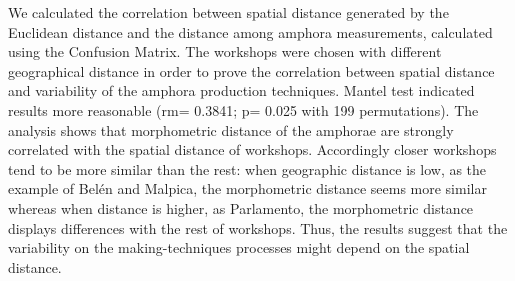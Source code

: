 \documentclass[review]{elsarticle}
\begin{document}
 We calculated the correlation between spatial distance generated by the Euclidean distance and the distance among amphora measurements, calculated using the Confusion Matrix. The workshops were chosen with different geographical distance in order to prove the correlation between spatial distance and variability of the amphora production techniques. Mantel test indicated results more reasonable (rm= 0.3841; p= 0.025 with 199 permutations). The analysis shows that morphometric distance of the amphorae are strongly correlated with the spatial distance of workshops. Accordingly closer workshops tend to be more similar than the rest: when geographic distance is low, as the example of Bel\'en and Malpica, the morphometric distance seems more similar whereas when distance is higher, as Parlamento, the morphometric distance displays differences with the rest of workshops. Thus, the results suggest that the variability on the making-techniques processes might depend on the spatial distance.   





\end{document}
